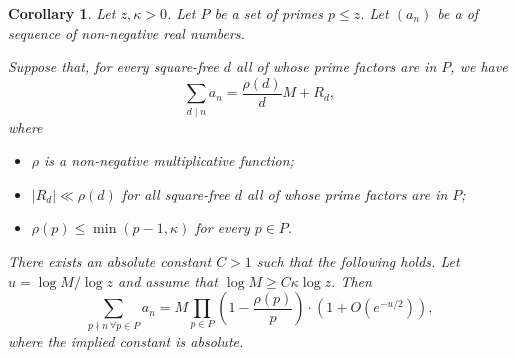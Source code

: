 \documentclass[11pt]{amsart}
\newtheorem{corollary}[theorem]{Corollary}
\theoremstyle{definition}
\renewcommand{\leq}{\leqslant}
\renewcommand{\geq}{\geqslant}
\begin{document}
\begin{corollary}
\label{cor:flst}
Let $z,\kappa>0$. Let $P$ be a set of primes $p\leq z$. Let $(a_n)$ be a of sequence of non-negative real numbers. 

Suppose that, for every square-free $d$ all of whose prime factors are in $P$, we have
\begin{equation*}
	\sum_{d\mid n} a_n = \frac{\rho(d)}{d}M + R_d,
\end{equation*} 
where 
\begin{itemize}
	\item $\rho$ is a non-negative multiplicative function;
	\item $|R_d| \ll \rho(d)$ for all square-free $d$ all of whose prime factors are in $P$;
	\item $\rho(p) \leq \min (p-1, \kappa)$ for every $p\in P$.
\end{itemize}
There exists an absolute constant $C>1$ such that the following holds. Let $u = {\log M}/\log z$ and assume that $\log M \geq C\kappa \log z$. Then
\begin{equation*}
\sum_{p\nmid n \, \forall p\in P} a_n = M\prod_{p\in P}\left(1-\frac{\rho(p)}{p}\right) \cdot \left(1+O\left(e^{-u/2}\right)\right),
\end{equation*}
where the implied constant is absolute.
\end{corollary}
\end{document}
